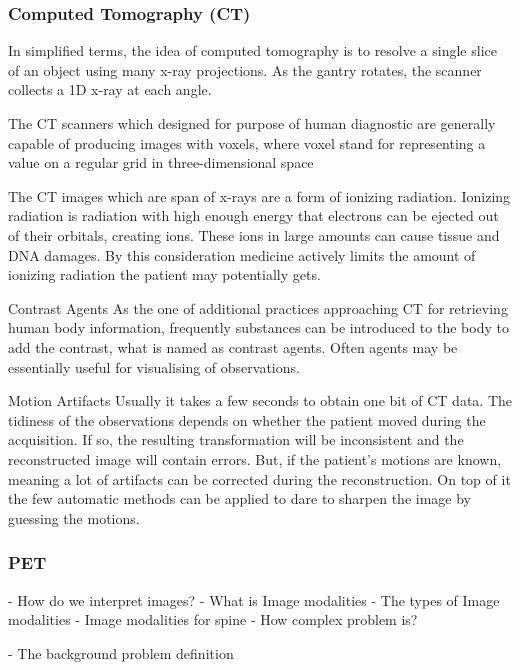 \subsubsection{Computed Tomography (CT)}
In simplified terms, the idea of computed tomography is to resolve a single slice of an object using many x-ray projections. As the gantry rotates, the scanner collects a 1D x-ray at each angle.

The CT scanners which designed for purpose of human diagnostic are generally capable of producing images with voxels, where voxel stand for representing a value on a regular grid in three-dimensional space    

The CT images which are span of x-rays are a form of ionizing radiation. Ionizing radiation is radiation with high enough energy that electrons can be ejected out of their orbitals, creating ions. These ions in large amounts can cause tissue and DNA damages. By this consideration medicine actively limits the amount of ionizing radiation the patient may potentially gets.

\item Contrast Agents
\newline
As the one of additional practices approaching CT for retrieving human body information, frequently substances can be introduced to the body to add the contrast, what is named as contrast agents. Often agents may be essentially useful for visualising of observations.          

\item Motion Artifacts
\newline
Usually it takes a few seconds to obtain one bit of CT data. The tidiness of the observations depends on whether the patient moved during the acquisition. If so, the resulting transformation will be inconsistent and the reconstructed image will contain errors. But, if the patient's motions are known, meaning a lot of artifacts can be corrected during the reconstruction. On top of it the few automatic methods can be applied to dare to sharpen the image by guessing the motions.

\subsubsection{PET}      





- How do we interpret images?
    - What is Image modalities
	- The types of Image modalities
    - Image modalities for spine
    - How complex problem is?
    
- The background problem definition
  
